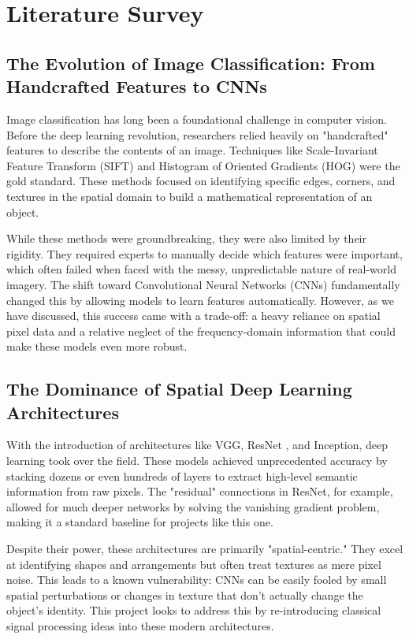 \chapter{Literature Survey}

\section{The Evolution of Image Classification: From Handcrafted Features to CNNs}

Image classification has long been a foundational challenge in computer vision. Before the deep learning revolution, researchers relied heavily on "handcrafted" features to describe the contents of an image. Techniques like Scale-Invariant Feature Transform (SIFT) and Histogram of Oriented Gradients (HOG) were the gold standard. These methods focused on identifying specific edges, corners, and textures in the spatial domain to build a mathematical representation of an object.

While these methods were groundbreaking, they were also limited by their rigidity. They required experts to manually decide which features were important, which often failed when faced with the messy, unpredictable nature of real-world imagery. The shift toward Convolutional Neural Networks (CNNs) fundamentally changed this by allowing models to learn features automatically. However, as we have discussed, this success came with a trade-off: a heavy reliance on spatial pixel data and a relative neglect of the frequency-domain information that could make these models even more robust.

\section{The Dominance of Spatial Deep Learning Architectures}

With the introduction of architectures like VGG, ResNet \cite{resnet}, and Inception, deep learning took over the field. These models achieved unprecedented accuracy by stacking dozens or even hundreds of layers to extract high-level semantic information from raw pixels. The "residual" connections in ResNet, for example, allowed for much deeper networks by solving the vanishing gradient problem, making it a standard baseline for projects like this one.

Despite their power, these architectures are primarily "spatial-centric." They excel at identifying shapes and arrangements but often treat textures as mere pixel noise. This leads to a known vulnerability: CNNs can be easily fooled by small spatial perturbations or changes in texture that don't actually change the object's identity. This project looks to address this by re-introducing classical signal processing ideas into these modern architectures.


